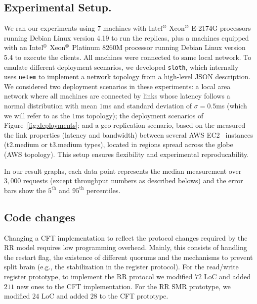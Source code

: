 \subsection{Experimental Setup.}
We ran our experiments using 7 machines  with
Intel$^\text{\textregistered}$ Xeon$^\text{\textregistered}$ E-2174G
processors running Debian Linux version 4.19 to run the replicas,
plus a machines equipped with an Intel$^\text{\textregistered}$
Xeon$^\text{\textregistered}$ Platinum 8260M processor running Debian
Linux version 5.4 to execute the clients.
%
All machines were connected to same local network. To emulate
different deployment scenarios, we developed
\texttt{sloth}\cite{sloth}, which internally uses
\texttt{netem}\cite{netem} to implement a network topology from a
high-level JSON description. We considered two deployment
scenarios in these experiments: a local area network where all
machines are connected by links whose latency follows a normal
distribution with mean $1$ms and standard deviation of $\sigma =
0.5$ms (which we will refer to as the $1$ms topology); the
deployment scenarios of Figure~\ref{fig:deployments}; and a
geo-replication scenario, based on the measured the link
properties (latency and bandwidth) between several AWS
EC2~\cite{ec2} instances (t2.medium or t3.medium types), located
in regions spread across the globe (AWS topology). This setup
ensures flexibility and experimental reproducability.

In our result graphs, each data point represents the median
measurement over $3,000$ requests (except throughput numbers as
described belows) and the error bars show the $5^{\text{th}}$ and
$95^{\text{th}}$ percentiles.

\subsection{Code changes}\label{ssec:implementation_effort}

Changing a \ac{CFT} implementation to reflect the protocol changes
required by the \ac{RR} model requires low programming
overhead. Mainly, this consists of handling the restart
flag, the existence of different quorums and the mechanisms to
prevent split brain (e.g., the stabilization in the register
protocol). For the read/write register prototype, to
implement the \ac{RR} protocol we modified $72$ LoC and added
$211$ new ones to the \ac{CFT} implementation. For the \ac{RR} SMR
prototype, we modified $24$ LoC and added $28$ to the \ac{CFT}
prototype.

